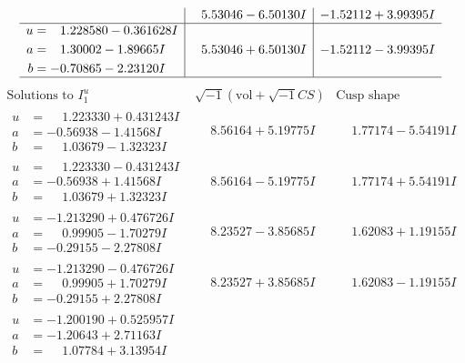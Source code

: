 \documentclass[1p]{elsarticle_modified}
\theoremstyle{definition}
\newcommand{\I}{\sqrt{-1}}
\begin{document}
$$\begin{array}{c|c|c}
 & \phantom{-}5.53046 - 6.50130 I & -1.52112 + 3.99395 I \\ \hline\begin{aligned}
u &= \phantom{-}1.228580 - 0.361628 I \\
a &= \phantom{-}1.30002 - 1.89665 I \\
b &= -0.70865 - 2.23120 I\end{aligned}
 & \phantom{-}5.53046 + 6.50130 I & -1.52112 - 3.99395 I\\
 \hline 
 \end{array}$$\newpage$$\begin{array}{c|c|c}  
\text{Solutions to }I^u_{1}& \I (\text{vol} + \sqrt{-1}CS) & \text{Cusp shape}\\
 \hline 
\begin{aligned}
u &= \phantom{-}1.223330 + 0.431243 I \\
a &= -0.56938 - 1.41568 I \\
b &= \phantom{-}1.03679 - 1.32323 I\end{aligned}
 & \phantom{-}8.56164 + 5.19775 I & \phantom{-}1.77174 - 5.54191 I \\ \hline\begin{aligned}
u &= \phantom{-}1.223330 - 0.431243 I \\
a &= -0.56938 + 1.41568 I \\
b &= \phantom{-}1.03679 + 1.32323 I\end{aligned}
 & \phantom{-}8.56164 - 5.19775 I & \phantom{-}1.77174 + 5.54191 I \\ \hline\begin{aligned}
u &= -1.213290 + 0.476726 I \\
a &= \phantom{-}0.99905 - 1.70279 I \\
b &= -0.29155 - 2.27808 I\end{aligned}
 & \phantom{-}8.23527 - 3.85685 I & \phantom{-}1.62083 + 1.19155 I \\ \hline\begin{aligned}
u &= -1.213290 - 0.476726 I \\
a &= \phantom{-}0.99905 + 1.70279 I \\
b &= -0.29155 + 2.27808 I\end{aligned}
 & \phantom{-}8.23527 + 3.85685 I & \phantom{-}1.62083 - 1.19155 I \\ \hline\begin{aligned}
u &= -1.200190 + 0.525957 I \\
a &= -1.20643 + 2.71163 I \\
b &= \phantom{-}1.07784 + 3.13954 I\end{aligned}

\end{array}$$
\end{document}
